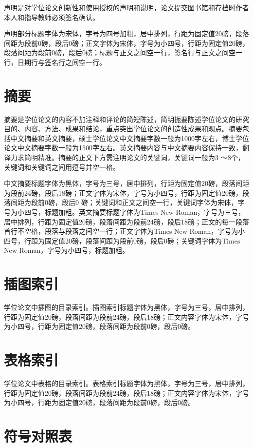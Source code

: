 声明是对学位论文创新性和使用授权的声明和说明，论文提交图书馆和存档时作者本人和指导教师必须签名确认。

声明部分标题字体为宋体，字号为四号加粗，居中排列，行距为固定值20磅，段落间距为段前0磅，段后0磅；正文字体为宋体，字号为小四号，行距为固定值20磅，段落间距为段前0磅，段后0磅；标题与正文之间空一行，签名行与正文之间空一行，日期行与签名行之间空一行。

\section{摘要}

摘要是学位论文的内容不加注释和评论的简短陈述，简明扼要陈述学位论文的研究目的、内容、方法、成果和结论，重点突出学位论文的创造性成果和观点。摘要包括中文摘要和英文摘要，硕士学位论文中文摘要字数一般为1000字左右，博士学位论文中文摘要字数一般为1500字左右。英文摘要内容与中文摘要内容保持一致，翻译力求简明精准。摘要的正文下方需注明论文的关键词，关键词一般为3 ～8个，关键词和关键词之间用逗号并空一格。

中文摘要标题字体为黑体，字号为三号，居中排列，行距为固定值20磅，段落间距为段前24磅，段后18磅；正文字体为宋体，字号为小四号，行距为固定值20磅，段落间距为段前0磅，段后0 磅；关键词和正文之间空一行，关键词字体为宋体，字号为小四号，标题加粗。英文摘要标题字体为Times New Roman，字号为三号，居中排列，行距为固定值20磅，段落间距为段前24磅，段后18磅；正文的每一段落首行不空格，段落与段落之间空一行；正文字体为Times New Roman，字号为小四号，行距为固定值20磅，段落间距为段前0磅，段后0磅；关键词字体为Times New Roman，字号为小四号，标题加粗。

\section{插图索引}

学位论文中插图的目录索引。插图索引标题字体为黑体，字号为三号，居中排列，行距为固定值20磅，段落间距为段前24磅，段后18磅；正文内容字体为宋体，字号为小四号，行距为固定值20磅，段落间距为段前0磅，段后0磅。

\section{表格索引}

学位论文中表格的目录索引。表格索引标题字体为黑体，字号为三号，居中排列，行距为固定值20磅，段落间距为段前24磅，段后18磅；正文内容字体为宋体，字号为小四号，行距为固定值20磅，段落间距为段前0磅，段后0磅。

\section{符号对照表}

